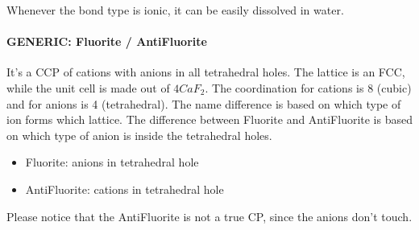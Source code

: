 Whenever the bond type is ionic, it can be easily dissolved in water.

\hrulefill

\paragraph{GENERIC: Fluorite / AntiFluorite} It's a CCP of cations with anions in all tetrahedral holes. The lattice is an FCC, while the unit cell is made out of $4 CaF_2$. The coordination for cations is 8 (cubic) and for anions is 4 (tetrahedral). The name difference is based on which type of ion forms which lattice. The difference between Fluorite and AntiFluorite is based on which type of anion is inside the tetrahedral holes.

\begin{itemize}
	\item Fluorite: anions in tetrahedral hole
	\item AntiFluorite: cations in tetrahedral hole
\end{itemize}

Please notice that the AntiFluorite is not a true CP, since the anions don't touch.